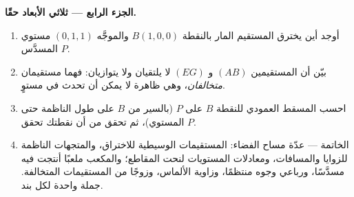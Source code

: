 \begin{problem}
\medskip
\noindent\textbf{الجزء الرابع --- ثلاثي الأبعاد حقًا.}
\begin{enumerate}[resume]
  \item أوجد أين يخترق المستقيم المار بالنقطة $B(1,0,0)$ والموجَّه 
        $(0,1,1)$ مستوي المسدَّس $P$.
  \item بيّن أن المستقيمين $(AB)$ و $(EG)$ لا يلتقيان ولا
        يتوازيان: فهما مستقيمان \emph{متخالفان}، وهي ظاهرة
        لا يمكن أن تحدث في مستوٍ.
  \item احسب المسقط العمودي للنقطة $B$ على $P$
        (بالسير من $B$ على طول الناظمة حتى المستوي)، ثم
        تحقق من أن نقطتك تحقق  $P$.
  \item الخاتمة --- عدّة مساح الفضاء: المستقيمات الوسيطية
        للاختراق، والمتجهات الناظمة للزوايا والمسافات،
        ومعادلات المستويات لنحت المقاطع؛ والمكعب ملعبًا
        أنتجت فيه مسدَّسًا، ورباعي وجوه منتظمًا،
        وزاوية الألماس، وزوجًا من المستقيمات المتخالفة.
        جملة واحدة لكل بند.
\end{enumerate}
\end{problem}

